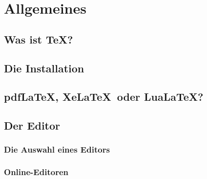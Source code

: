 \chapter{Allgemeines}
\label{cha:allgemeines}
\section{Was ist \TeX?}
\label{sec:tex}
\section{Die Installation}
\label{sec:installation}
\section{pdf\LaTeX , Xe\LaTeX\ oder Lua\LaTeX ?}
\label{sec:pdf}
\section{Der Editor}
\label{sec:editor}
\subsection{Die Auswahl eines Editors}
\subsection{Online-Editoren}
